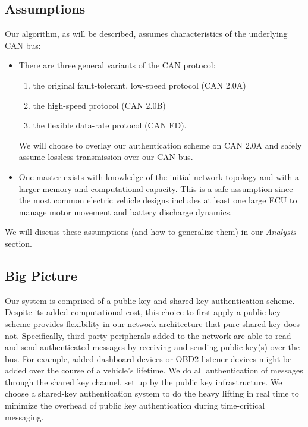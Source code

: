 \documentclass{article}
\begin{document}
    \subsection{Assumptions}
    Our algorithm, as will be described, assumes characteristics of the underlying CAN bus:
    \begin{itemize}
    \item There are three general variants of the CAN protocol: 
      \begin{enumerate} 
        \item the original fault-tolerant, low-speed protocol (CAN 2.0A)
        \item the high-speed protocol (CAN 2.0B)
        \item the flexible data-rate protocol (CAN FD). 
      \end{enumerate} 
        We will choose to overlay our authentication scheme on CAN 2.0A and safely assume lossless transmission over our CAN bus.
    \item One master exists with knowledge of the initial network topology and with a larger memory and computational capacity. This is a safe assumption since the most common electric vehicle designs includes at least one large ECU to manage motor movement and battery discharge dynamics.
    \end{itemize}
    We will discuss these assumptions (and how to generalize them) in our \textit{Analysis} section.
    \subsection{Big Picture}
    
    Our system is comprised of a public key and shared key authentication scheme. Despite its added computational cost, this choice to first apply a public-key scheme provides flexibility in our network architecture that pure shared-key does not. Specifically, third party peripherals added to the network are able to read and send authenticated messages by receiving and sending public key(s) over the bus. For example, added dashboard devices or OBD2 listener devices might be added over the course of a vehicle's lifetime. We do all authentication of messages through the shared key channel, set up by the public key infrastructure. We choose a shared-key authentication system to do the heavy lifting in real time to minimize the overhead of public key authentication during time-critical messaging.\\
    
\end{document}

